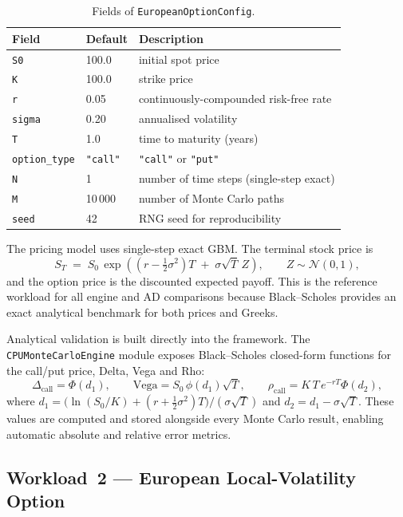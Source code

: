 \begin{table}[h]
\centering
\caption{Fields of \texttt{EuropeanOptionConfig}.}
\label{tab:european-fields}
\begin{tabular}{lll}
\hline
Field & Default & Description \\
\hline
\texttt{S0} & 100.0 & initial spot price \\
\texttt{K} & 100.0 & strike price \\
\texttt{r} & 0.05 & continuously-compounded risk-free rate \\
\texttt{sigma} & 0.20 & annualised volatility \\
\texttt{T} & 1.0 & time to maturity (years) \\
\texttt{option\_type} & \texttt{"call"} & \texttt{"call"} or \texttt{"put"} \\
\texttt{N} & 1 & number of time steps (single-step exact) \\
\texttt{M} & 10\,000 & number of Monte Carlo paths \\
\texttt{seed} & 42 & RNG seed for reproducibility \\
\hline
\end{tabular}
\end{table}

The pricing model uses single-step exact GBM. The terminal stock price is
\[
S_T \;=\; S_0\,\exp\!\left(\left(r - \tfrac{1}{2}\sigma^2\right)T \;+\; \sigma\sqrt{T}\,Z\right),
\qquad Z \sim \mathcal{N}(0,1),
\]
and the option price is the discounted expected payoff. This is the reference
workload for all engine and AD comparisons because Black--Scholes provides an
exact analytical benchmark for both prices and Greeks.

Analytical validation is built directly into the framework. The
\texttt{CPUMonteCarloEngine} module exposes Black--Scholes closed-form
functions for the call/put price, Delta, Vega and Rho:
\[
\Delta_{\text{call}} = \Phi(d_1), \qquad
\mathrm{Vega} = S_0\,\phi(d_1)\sqrt{T}, \qquad
\rho_{\text{call}} = K\,T\,e^{-rT}\Phi(d_2),
\]
where $d_1 = \bigl(\ln(S_0/K) + (r+\tfrac{1}{2}\sigma^2)T\bigr) / (\sigma\sqrt{T})$
and $d_2 = d_1 - \sigma\sqrt{T}$. These values are computed and stored alongside
every Monte Carlo result, enabling automatic absolute and relative error metrics.

\subsection{Workload~2 --- European Local-Volatility Option}
\label{sec:workload-localvol}

